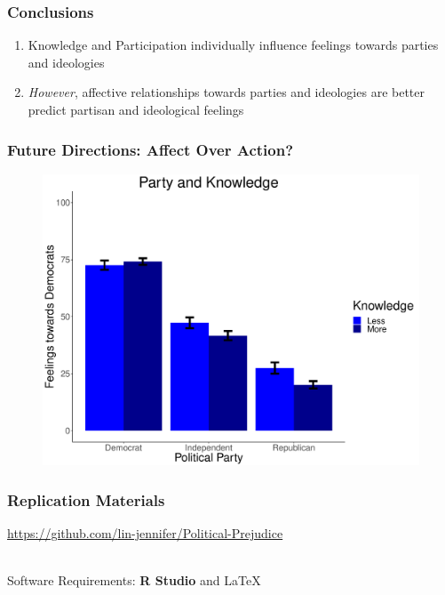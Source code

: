 \documentclass[14pt]{beamer}
\newcommand\e{\emph}
\newcommand\tb{\textbf}
\begin{document}
\begin{frame}
\frametitle{Conclusions}
\begin{enumerate}
	\item Knowledge and Participation individually influence feelings towards parties and ideologies
	\item \e{However}, affective relationships towards parties and ideologies are better predict partisan and ideological feelings
\end{enumerate}
\end{frame}

\begin{frame}
\frametitle{Future Directions: Affect Over Action?}
\begin{center}
	\begin{figure}[ht!]  
		{	 \includegraphics[width=.8\textwidth]{KnowPartyDem}}
	\end{figure}
\end{center}
\end{frame}

\begin{frame}
\frametitle{Replication Materials}
\begin{center}
	\url{https://github.com/lin-jennifer/Political-Prejudice}
	
~~\\
Software Requirements: \tb{R Studio} and \LaTeX

\end{center}
\end{frame}
\end{document}
